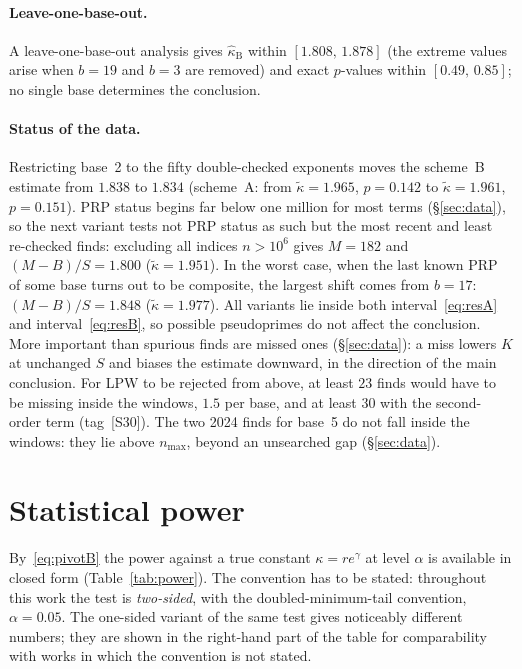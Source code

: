 \documentclass[11pt,a4paper]{article}
\theoremstyle{plain}
\theoremstyle{remark}
\newcommand{\eg}{e^{\gamma}}
\begin{document}
\paragraph{Leave-one-base-out.} A leave-one-base-out analysis gives
$\hat\kappa_{\mathrm B}$ within $[1.808,\,1.878]$ (the extreme values arise when
$b=19$ and $b=3$ are removed) and exact $p$-values within
$[0.49,\,0.85]$; no single base determines the conclusion.

\paragraph{Status of the data.} Restricting base~2 to the fifty double-checked
exponents moves the scheme~B estimate from $1.838$ to $1.834$ (scheme~A: from
$\tilde\kappa=1.965$, $p=0.142$ to $\tilde\kappa=1.961$, $p=0.151$). PRP status
begins far below one million for most terms (\S\ref{sec:data}), so the next
variant tests not PRP status as such but the most recent and least re-checked
finds: excluding all indices $n>10^6$ gives $M=182$ and $(M-B)/S=1.800$
($\tilde\kappa=1.951$). In the worst case, when the last known PRP of some base
turns out to be composite, the largest shift comes from $b=17$: $(M-B)/S=1.848$
($\tilde\kappa=1.977$). All variants lie inside both interval~\eqref{eq:resA} and
interval~\eqref{eq:resB}, so possible pseudoprimes do not affect the conclusion.
More important than spurious finds are missed ones (\S\ref{sec:data}): a miss
lowers $K$ at unchanged $S$ and biases the estimate downward, in the direction of
the main conclusion. For LPW to be rejected from above, at least $23$ finds would
have to be missing inside the windows, $1.5$ per base, and at least $30$ with the
second-order term (tag~[S30]). The two 2024 finds for base~5 do not fall inside
the windows: they lie above $n_{\max}$, beyond an unsearched gap
(\S\ref{sec:data}).

\section{Statistical power}\label{sec:power}

By~\eqref{eq:pivotB} the power against a true constant $\kappa=r\eg$ at level
$\alpha$ is available in closed form (Table~\ref{tab:power}). The convention has
to be stated: throughout this work the test is \emph{two-sided}, with the
doubled-minimum-tail convention, $\alpha=0.05$. The one-sided variant of the same
test gives noticeably different numbers; they are shown in the right-hand part
of the table for comparability with works in which the convention is not stated.
\end{document}
